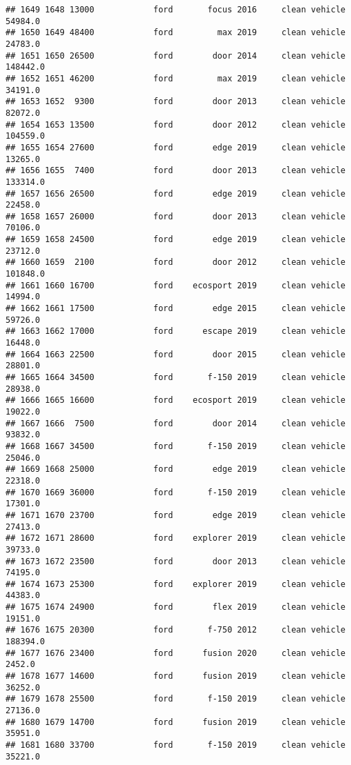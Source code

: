 \documentclass[
]{article}
\begin{document}
\begin{verbatim}
## 1649 1648 13000            ford       focus 2016     clean vehicle   54984.0
## 1650 1649 48400            ford         max 2019     clean vehicle   24783.0
## 1651 1650 26500            ford        door 2014     clean vehicle  148442.0
## 1652 1651 46200            ford         max 2019     clean vehicle   34191.0
## 1653 1652  9300            ford        door 2013     clean vehicle   82072.0
## 1654 1653 13500            ford        door 2012     clean vehicle  104559.0
## 1655 1654 27600            ford        edge 2019     clean vehicle   13265.0
## 1656 1655  7400            ford        door 2013     clean vehicle  133314.0
## 1657 1656 26500            ford        edge 2019     clean vehicle   22458.0
## 1658 1657 26000            ford        door 2013     clean vehicle   70106.0
## 1659 1658 24500            ford        edge 2019     clean vehicle   23712.0
## 1660 1659  2100            ford        door 2012     clean vehicle  101848.0
## 1661 1660 16700            ford    ecosport 2019     clean vehicle   14994.0
## 1662 1661 17500            ford        edge 2015     clean vehicle   59726.0
## 1663 1662 17000            ford      escape 2019     clean vehicle   16448.0
## 1664 1663 22500            ford        door 2015     clean vehicle   28801.0
## 1665 1664 34500            ford       f-150 2019     clean vehicle   28938.0
## 1666 1665 16600            ford    ecosport 2019     clean vehicle   19022.0
## 1667 1666  7500            ford        door 2014     clean vehicle   93832.0
## 1668 1667 34500            ford       f-150 2019     clean vehicle   25046.0
## 1669 1668 25000            ford        edge 2019     clean vehicle   22318.0
## 1670 1669 36000            ford       f-150 2019     clean vehicle   17301.0
## 1671 1670 23700            ford        edge 2019     clean vehicle   27413.0
## 1672 1671 28600            ford    explorer 2019     clean vehicle   39733.0
## 1673 1672 23500            ford        door 2013     clean vehicle   74195.0
## 1674 1673 25300            ford    explorer 2019     clean vehicle   44383.0
## 1675 1674 24900            ford        flex 2019     clean vehicle   19151.0
## 1676 1675 20300            ford       f-750 2012     clean vehicle  188394.0
## 1677 1676 23400            ford      fusion 2020     clean vehicle    2452.0
## 1678 1677 14600            ford      fusion 2019     clean vehicle   36252.0
## 1679 1678 25500            ford       f-150 2019     clean vehicle   27136.0
## 1680 1679 14700            ford      fusion 2019     clean vehicle   35951.0
## 1681 1680 33700            ford       f-150 2019     clean vehicle   35221.0

\end{verbatim}
\end{document}

